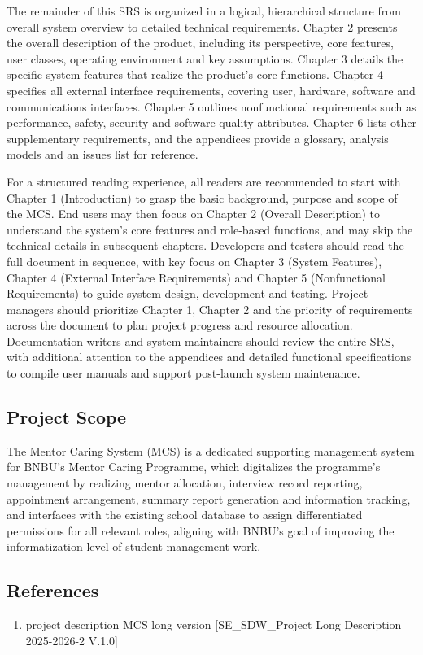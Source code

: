 The remainder of this SRS is organized in a logical, hierarchical structure from overall system overview to detailed technical requirements. Chapter 2 presents the overall description of the product, including its perspective, core features, user classes, operating environment and key assumptions. Chapter 3 details the specific system features that realize the product's core functions. Chapter 4 specifies all external interface requirements, covering user, hardware, software and communications interfaces. Chapter 5 outlines nonfunctional requirements such as performance, safety, security and software quality attributes. Chapter 6 lists other supplementary requirements, and the appendices provide a glossary, analysis models and an issues list for reference.

For a structured reading experience, all readers are recommended to start with Chapter 1 (Introduction) to grasp the basic background, purpose and scope of the MCS. End users may then focus on Chapter 2 (Overall Description) to understand the system's core features and role-based functions, and may skip the technical details in subsequent chapters. Developers and testers should read the full document in sequence, with key focus on Chapter 3 (System Features), Chapter 4 (External Interface Requirements) and Chapter 5 (Nonfunctional Requirements) to guide system design, development and testing. Project managers should prioritize Chapter 1, Chapter 2 and the priority of requirements across the document to plan project progress and resource allocation. Documentation writers and system maintainers should review the entire SRS, with additional attention to the appendices and detailed functional specifications to compile user manuals and support post-launch system maintenance.

\subsection{Project Scope}

The Mentor Caring System (MCS) is a dedicated supporting management system for BNBU's Mentor Caring Programme, which digitalizes the programme's management by realizing mentor allocation, interview record reporting, appointment arrangement, summary report generation and information tracking, and interfaces with the existing school database to assign differentiated permissions for all relevant roles, aligning with BNBU's goal of improving the informatization level of student management work.

\subsection{References}

\begin{enumerate}
\item project description MCS long version [SE\_SDW\_Project Long Description 2025-2026-2 V.1.0]
\end{enumerate}
